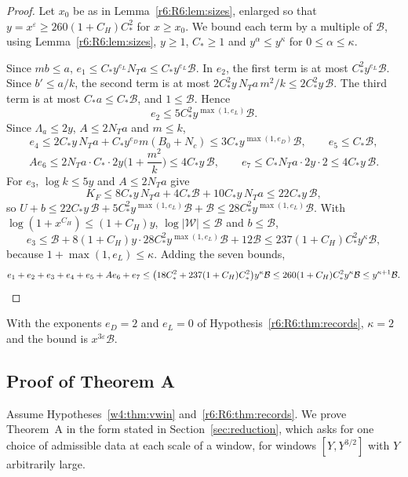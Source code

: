 \begin{proof}
Let $x_0$ be as in Lemma~\ref{r6:R6:lem:sizes}, enlarged so that $y=x^\varepsilon\ge260(1+C_H)C_\ast^2$ for $x\ge x_0$. We bound each term by a multiple of $\mathcal B$, using Lemma~\ref{r6:R6:lem:sizes}, $y\ge1$, $C_\ast\ge1$ and $y^\alpha\le y^\kappa$ for $0\le\alpha\le\kappa$.

Since $mb\le a$, $e_1\le C_\ast y^{e_L}N_Ta\le C_\ast y^{e_L}\mathcal B$. In $e_2$, the first term is at most $C_\ast^2y^{e_L}\mathcal B$. Since $b'\le a/k$, the second term is at most $2C_\ast^2y\,N_Ta\,m^2/k\le2C_\ast^2y\,\mathcal B$. The third term is at most $C_\ast a\le C_\ast\mathcal B$, and $1\le\mathcal B$. Hence
\[
e_2\le5C_\ast^2y^{\max(1,e_L)}\mathcal B .
\]
Since $\Lambda_a\le2y$, $A\le2N_Ta$ and $m\le k$,
\[
e_4\le2C_\ast y\,N_Ta+C_\ast y^{e_D}m(B_0+N_c)\le3C_\ast y^{\max(1,e_D)}\mathcal B,\qquad e_5\le C_\ast\mathcal B,
\]
\[
Ae_6\le2N_Ta\cdot C_\ast\cdot2y\Big(1+\frac{m^2}k\Big)\le4C_\ast y\,\mathcal B,\qquad e_7\le C_\ast N_Ta\cdot2y\cdot2\le4C_\ast y\,\mathcal B .
\]
For $e_3$, $\log k\le5y$ and $A\le2N_Ta$ give
\[
K_F\le8C_\ast y\,N_Ta+4C_\ast\mathcal B+10C_\ast y\,N_Ta\le22C_\ast y\,\mathcal B,
\]
so $U+b\le22C_\ast y\,\mathcal B+5C_\ast^2y^{\max(1,e_L)}\mathcal B+\mathcal B\le28C_\ast^2y^{\max(1,e_L)}\mathcal B$. With $\log(1+x^{C_H})\le(1+C_H)y$, $\log\lvert\mathcal W\rvert\le\mathcal B$ and $b\le\mathcal B$,
\[
e_3\le\mathcal B+8(1+C_H)y\cdot28C_\ast^2y^{\max(1,e_L)}\mathcal B+12\mathcal B\le237(1+C_H)C_\ast^2y^{\kappa}\mathcal B,
\]
because $1+\max(1,e_L)\le\kappa$. Adding the seven bounds,
\[
e_1+e_2+e_3+e_4+e_5+Ae_6+e_7\le\big(18C_\ast^2+237(1+C_H)C_\ast^2\big)y^\kappa\mathcal B\le260(1+C_H)C_\ast^2y^\kappa\mathcal B\le y^{\kappa+1}\mathcal B .\qedhere
\]
\end{proof}

With the exponents $e_D=2$ and $e_L=0$ of Hypothesis~\ref{r6:R6:thm:records}, $\kappa=2$ and the bound is $x^{3\varepsilon}\mathcal B$.

\subsection{Proof of Theorem A}\label{r6:R6:sec:thmA}

Assume Hypotheses~\ref{w4:thm:vwin} and~\ref{r6:R6:thm:records}. We prove Theorem~A in the form stated in Section~\ref{sec:reduction}, which asks for one choice of admissible data at each scale of a window, for windows $[Y,Y^{3/2}]$ with $Y$ arbitrarily large.

